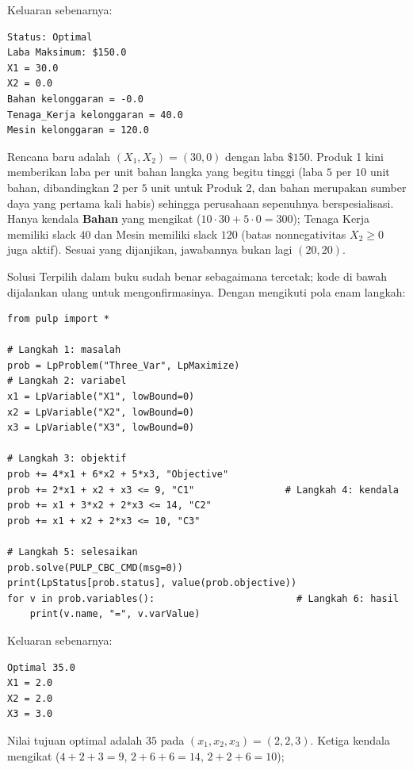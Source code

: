 Keluaran sebenarnya:

\begin{verbatim}
Status: Optimal
Laba Maksimum: $150.0
X1 = 30.0
X2 = 0.0
Bahan kelonggaran = -0.0
Tenaga_Kerja kelonggaran = 40.0
Mesin kelonggaran = 120.0
\end{verbatim}

Rencana baru adalah $(X_1, X_2) = (30, 0)$ dengan laba $\$150$. Produk 1 kini
memberikan laba per unit bahan langka yang begitu tinggi (laba $5$ per $10$
unit bahan, dibandingkan $2$ per $5$ unit untuk Produk 2, dan bahan merupakan
sumber daya yang pertama kali habis) sehingga perusahaan sepenuhnya
berspesialisasi. Hanya kendala \textbf{Bahan} yang mengikat
($10 \cdot 30 + 5 \cdot 0 = 300$); Tenaga Kerja memiliki slack $40$ dan Mesin
memiliki slack $120$ (batas nonnegativitas $X_2 \geq 0$ juga aktif). Sesuai
yang dijanjikan, jawabannya bukan lagi $(20,20)$.


Solusi Terpilih dalam buku sudah benar sebagaimana tercetak; kode di bawah
dijalankan ulang untuk mengonfirmasinya. Dengan mengikuti pola enam langkah:

\begin{verbatim}
from pulp import *

# Langkah 1: masalah
prob = LpProblem("Three_Var", LpMaximize)
# Langkah 2: variabel
x1 = LpVariable("X1", lowBound=0)
x2 = LpVariable("X2", lowBound=0)
x3 = LpVariable("X3", lowBound=0)

# Langkah 3: objektif
prob += 4*x1 + 6*x2 + 5*x3, "Objective"
prob += 2*x1 + x2 + x3 <= 9, "C1"                # Langkah 4: kendala
prob += x1 + 3*x2 + 2*x3 <= 14, "C2"
prob += x1 + x2 + 2*x3 <= 10, "C3"

# Langkah 5: selesaikan
prob.solve(PULP_CBC_CMD(msg=0))
print(LpStatus[prob.status], value(prob.objective))
for v in prob.variables():                         # Langkah 6: hasil
    print(v.name, "=", v.varValue)
\end{verbatim}

Keluaran sebenarnya:

\begin{verbatim}
Optimal 35.0
X1 = 2.0
X2 = 2.0
X3 = 3.0
\end{verbatim}

Nilai tujuan optimal adalah $35$ pada $(x_1, x_2, x_3) = (2, 2, 3)$.
Ketiga kendala mengikat ($4+2+3 = 9$, $2+6+6 = 14$, $2+2+6 = 10$);

